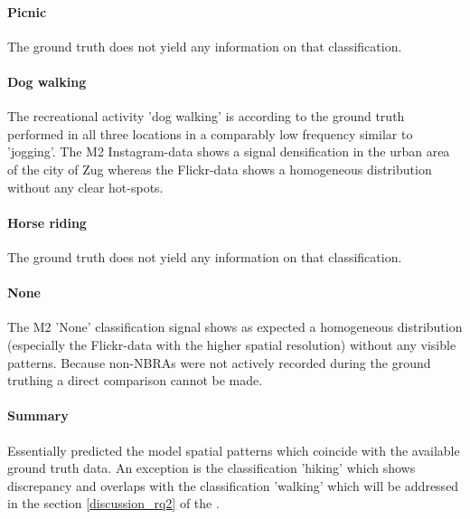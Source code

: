\paragraph*{Picnic}
The ground truth does not yield any information on that classification.

\paragraph*{Dog walking}
The recreational activity 'dog walking' is according to the ground truth performed in all three locations in a comparably low frequency similar to 'jogging'. The M2 Instagram-data shows a signal densification in the urban area of the city of Zug whereas the Flickr-data shows a homogeneous distribution without any clear hot-spots.

\paragraph*{Horse riding}
The ground truth does not yield any information on that classification.

\paragraph*{None} The M2 'None' classification signal shows as expected a homogeneous distribution (especially the Flickr-data with the higher spatial resolution) without any visible patterns. Because non-NBRAs were not actively recorded during the ground truthing a direct comparison cannot be made.

\paragraph*{Summary}
Essentially predicted the model spatial patterns which coincide with the available ground truth data. An exception is the classification 'hiking' which shows discrepancy and overlaps with the classification 'walking' which will be addressed in the section \ref{discussion_rq2} of the .

